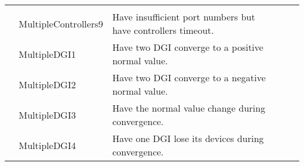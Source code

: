 \documentclass{article}
\newcounter{rownum}
\newcommand\rownumber{\stepcounter{rownum}\arabic{rownum}}
\begin{document}
\begin{longtable}{|c|p{4cm}|p{5cm}|c|p{6cm}|}
               & & \\
    \rownumber & MultipleControllers9 & Have insufficient port numbers but have controllers timeout.
               & & \\
    \rownumber & MultipleDGI1 & Have two DGI converge to a positive normal value.
               & & \\
    \rownumber & MultipleDGI2 & Have two DGI converge to a negative normal value.
               & & \\
    \rownumber & MultipleDGI3 & Have the normal value change during convergence.
               & & \\
    \rownumber & MultipleDGI4 & Have one DGI lose its devices during convergence.
               & & \\
\end{longtable}
\end{document}
